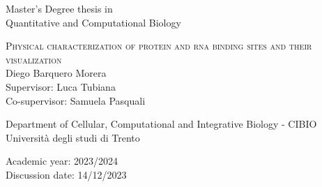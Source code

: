 \begin{center}
  \begin{figure}[h!]
    \centerline{}
  \end{figure}

  \vspace{1 cm}
  \Large{Master's Degree thesis in\\Quantitative and Computational Biology\\}
  \vspace{1 cm}

  \LARGE\textsc{Physical characterization of protein and rna binding sites and their visualization\\}
  \vspace{0.5 cm}
  \LARGE{Diego Barquero Morera\\}
  \vspace{0.5 cm}
  \Large{Supervisor: Luca Tubiana\\}
  \Large{Co-supervisor: Samuela Pasquali\\}

  \vspace{2 cm}
  \Large{Department of Cellular, Computational and Integrative Biology - CIBIO\\}
  \Large{Università degli studi di Trento}
  \vspace{0.5 cm}

  \Large{Academic year: 2023/2024}\\
  \Large{Discussion date: 14/12/2023}
\end{center}
\maketitle
